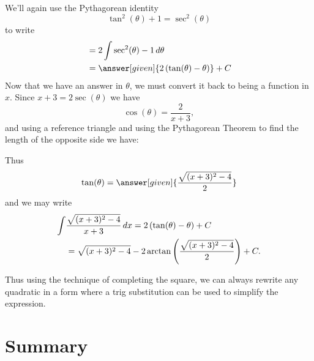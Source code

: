 \documentclass{ximera}
\begin{document}
\begin{example}
\begin{explanation}
    We'll again use the Pythagorean identity
    \[
    \tan^2(\theta) + 1 = \sec^2(\theta)
    \]
    to write
    \begin{align*}
      &= 2\int \sec^2(\theta) - 1 \d \theta\\
      &= \answer[given]{2\left(\tan(\theta) - \theta\right)} + C
    \end{align*}
    Now that we have an answer in $\theta$, we must convert it back to
    being a function in $x$. Since $x+3 = 2\sec(\theta)$ we have
    \[
    \cos(\theta) = \frac{2}{x+3},
    \]
    and using a reference triangle and using the Pythagorean Theorem
to find the length of the opposite side we have:
    \begin{image}
    \end{image}
    Thus
    \[
    \tan(\theta) = \answer[given]{\frac{\sqrt{(x+3)^{2}-4}}{2}}
    \]
    and we may write
    \begin{align*}
    \int &\frac{\sqrt{(x+3)^2-4}}{x+3} \mathop{}\!d x = 2\left(\tan(\theta) - \theta\right) + C\\
      &= \sqrt{(x+3)^{2}-4} - 2\arctan\left(\frac{\sqrt{(x+3)^{2}-4}}{2}\right) + C.
    \end{align*}
  \end{explanation}
\end{example}

Thus using the technique of completing the square, we can always rewrite any quadratic in a form where a trig
substitution can be used to simplify the expression. 



\section{Summary}
\end{document}
